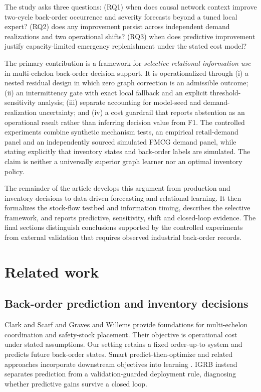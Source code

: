 \documentclass[11pt,a4paper]{article}
\begin{document}
The study asks three questions: (RQ1) when does causal network context improve two-cycle back-order occurrence and severity forecasts beyond a tuned local expert? (RQ2) does any improvement persist across independent demand realizations and two operational shifts? (RQ3) when does predictive improvement justify capacity-limited emergency replenishment under the stated cost model?

The primary contribution is a framework for \emph{selective relational information use} in multi-echelon back-order decision support. It is operationalized through (i) a nested residual design in which zero graph correction is an admissible outcome; (ii) an intermittency gate with exact local fallback and an explicit threshold-sensitivity analysis; (iii) separate accounting for model-seed and demand-realization uncertainty; and (iv) a cost guardrail that reports abstention as an operational result rather than inferring decision value from F1. The controlled experiments combine synthetic mechanism tests, an empirical retail-demand panel and an independently sourced simulated FMCG demand panel, while stating explicitly that inventory states and back-order labels are simulated. The claim is neither a universally superior graph learner nor an optimal inventory policy.

The remainder of the article develops this argument from production and inventory decisions to data-driven forecasting and relational learning. It then formalizes the stock-flow testbed and information timing, describes the selective framework, and reports predictive, sensitivity, shift and closed-loop evidence. The final sections distinguish conclusions supported by the controlled experiments from external validation that requires observed industrial back-order records.

\section{Related work}
\subsection{Back-order prediction and inventory decisions}
Clark and Scarf \cite{clark} and Graves and Willems \cite{graves} provide foundations for multi-echelon coordination and safety-stock placement. Their objective is operational cost under stated assumptions. Our setting retains a fixed order-up-to system and predicts future back-order states. Smart predict-then-optimize and related approaches incorporate downstream objectives into learning \cite{spo,trees,mandi}. IGRB instead separates prediction from a validation-guarded deployment rule, diagnosing whether predictive gains survive a closed loop.
\end{document}

